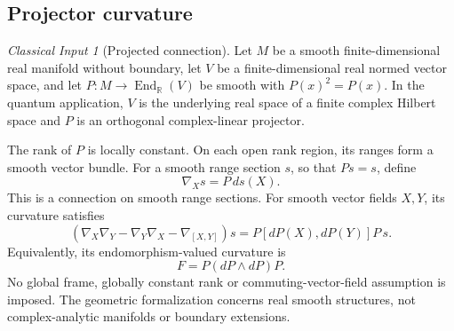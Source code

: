 \documentclass[11pt]{article}
\theoremstyle{definition}
\theoremstyle{remark}
\newtheorem{classical}[theorem]{Classical Input}
\newcommand{\bbR}{\mathbb R}
\begin{document}
\subsection{Projector curvature}

\begin{classical}[Projected connection]\label{thm:projected}
Let $M$ be a smooth finite-dimensional real manifold without boundary, let $V$ be a finite-dimensional real normed vector space, and let $P:M\to\operatorname{End}_{\bbR}(V)$ be smooth with $P(x)^2=P(x)$. In the quantum application, $V$ is the underlying real space of a finite complex Hilbert space and $P$ is an orthogonal complex-linear projector.

The rank of $P$ is locally constant. On each open rank region, its ranges form a smooth vector bundle. For a smooth range section $s$, so that $Ps=s$, define
\[
\nabla_Xs=P\,ds(X).
\]
This is a connection on smooth range sections. For smooth vector fields $X,Y$, its curvature satisfies
\[
\boxed{
(\nabla_X\nabla_Y-\nabla_Y\nabla_X-\nabla_{[X,Y]})s
=P[dP(X),dP(Y)]P\,s.
}
\]
Equivalently, its endomorphism-valued curvature is
\[
\boxed{F=P(dP\wedge dP)P.}
\]
No global frame, globally constant rank or commuting-vector-field assumption is imposed. The geometric formalization concerns real smooth structures, not complex-analytic manifolds or boundary extensions.
\end{classical}
\end{document}
